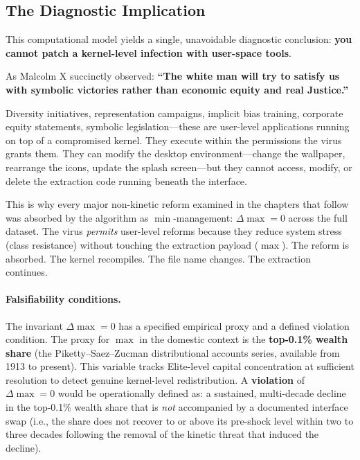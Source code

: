 \subsection{The Diagnostic Implication}

This computational model yields a single, unavoidable diagnostic conclusion: \textbf{you cannot patch a kernel-level infection with user-space tools}.

As Malcolm X succinctly observed: \textbf{``The white man will try to satisfy us with symbolic victories rather than economic equity and real Justice.''}

Diversity initiatives, representation campaigns, implicit bias training, corporate equity statements, symbolic legislation---these are user-level applications running on top of a compromised kernel. They execute within the permissions the virus grants them. They can modify the desktop environment---change the wallpaper, rearrange the icons, update the splash screen---but they cannot access, modify, or delete the extraction code running beneath the interface.

This is why every major non-kinetic reform examined in the chapters that follow was absorbed by the algorithm as $\min$-management: $\Delta\max = 0$ across the full dataset. The virus \textit{permits} user-level reforms because they reduce system stress (class resistance) without touching the extraction payload ($\max$). The reform is absorbed. The kernel recompiles. The file name changes. The extraction continues.

\paragraph{Falsifiability conditions.}
\label{sec:falsifiability}
The invariant $\Delta\max = 0$ has a specified empirical proxy and a defined violation condition. The proxy for $\max$ in the domestic context is the \textbf{top-0.1\% wealth share} (the Piketty--Saez--Zucman distributional accounts series, available from 1913 to present). This variable tracks Elite-level capital concentration at sufficient resolution to detect genuine kernel-level redistribution. A \textbf{violation} of $\Delta\max = 0$ would be operationally defined as: a sustained, multi-decade decline in the top-0.1\% wealth share that is \textit{not} accompanied by a documented interface swap (i.e., the share does not recover to or above its pre-shock level within two to three decades following the removal of the kinetic threat that induced the decline).

